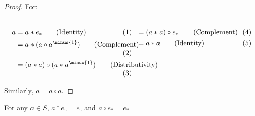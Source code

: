             \begin{proof}
                For:
                \par\vspace{-2.5ex}
                \begin{subequations}
                    \begin{minipage}[t]{0.49\textwidth}
                        \begin{align}
                            a&=a*e_{*}
                            \tag{Identity}\\
                            &=a*(a\circ{a}^{\minus{1}})
                            \tag{Complement}\\
                            &=(a*a)\circ(a*a^{\minus{1}})
                            \tag{Distributivity}
                        \end{align}
                    \end{minipage}
                    \hfill
                    \begin{minipage}[t]{0.49\textwidth}
                        \begin{align}
                            &=(a*a)\circ{e}_{\circ}
                            \tag{Complement}\\
                            &=a*a\tag{Identity}
                        \end{align}
                    \end{minipage}
                \end{subequations}
                \par\vspace{2.5ex}
                Similarly, $a=a\circ a$.
            \end{proof}
            \begin{theorem}
                For any $a\in S$, $a*e_{\circ}=e_{\circ}$
                and $a\circ e_{*}=e_{*}$
            \end{theorem}
